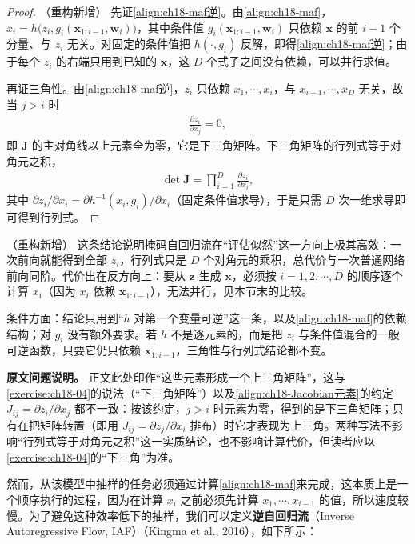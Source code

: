 \documentclass[../../main.tex]{subfiles}
\begin{document}
\begin{proof}（重构新增）
先证\eqref{align:ch18-maf逆}。由\eqref{align:ch18-maf}，$x_i=h\big(z_i,g_i(\bm{x}_{1:i-1},\bm{w}_i)\big)$，其中条件值 $g_i(\bm{x}_{1:i-1},\bm{w}_i)$ 只依赖 $\bm{x}$ 的前 $i-1$ 个分量、与 $z_i$ 无关。对固定的条件值把 $h(\cdot,g_i)$ 反解，即得\eqref{align:ch18-maf逆}；由于每个 $z_i$ 的右端只用到已知的 $\bm{x}$，这 $D$ 个式子之间没有依赖，可以并行求值。

再证三角性。由\eqref{align:ch18-maf逆}，$z_i$ 只依赖 $x_1,\cdots,x_i$，与 $x_{i+1},\cdots,x_D$ 无关，故当 $j>i$ 时
\begin{align*}
  \frac{\partial z_i}{\partial x_j}=0,
\end{align*}
即 $\bm{J}$ 的主对角线以上元素全为零，它是下三角矩阵。下三角矩阵的行列式等于对角元之积，
\begin{align*}
  \det\bm{J}=\prod_{i=1}^{D}\frac{\partial z_i}{\partial x_i},
\end{align*}
其中 $\partial z_i/\partial x_i=\partial h^{-1}(x_i,g_i)/\partial x_i$（固定条件值求导），于是只需 $D$ 次一维求导即可得到行列式。
\end{proof}

\begin{remark}（重构新增）
这条结论说明掩码自回归流在“评估似然”这一方向上极其高效：一次前向就能得到全部 $z_i$，行列式只是 $D$ 个对角元的乘积，总代价与一次普通网络前向同阶。代价出在反方向上：要从 $\bm{z}$ 生成 $\bm{x}$，必须按 $i=1,2,\cdots,D$ 的顺序逐个计算 $x_i$（因为 $x_i$ 依赖 $\bm{x}_{1:i-1}$），无法并行，见本节末的比较。

条件方面：结论只用到“$h$ 对第一个变量可逆”这一条，以及\eqref{align:ch18-maf}的依赖结构；对 $g_i$ 没有额外要求。若 $h$ 不是逐元素的，而是把 $z_i$ 与条件值混合的一般可逆函数，只要它仍只依赖 $\bm{x}_{1:i-1}$，三角性与行列式结论都不变。

\textbf{原文问题说明。} 正文此处印作“这些元素形成一个上三角矩阵”，这与\cref{exercise:ch18-04}的说法（“下三角矩阵”）以及\eqref{align:ch18-Jacobian元素}的约定 $J_{ij}=\partial z_i/\partial x_j$ 都不一致：按该约定，$j>i$ 时元素为零，得到的是下三角矩阵；只有在把矩阵转置（即用 $J_{ij}=\partial z_j/\partial x_i$ 排布）时它才表现为上三角。两种写法不影响“行列式等于对角元之积”这一实质结论，也不影响计算代价，但读者应以\cref{exercise:ch18-04}的“下三角”为准。
\end{remark}

然而，从该模型中抽样的任务必须通过计算\eqref{align:ch18-maf}来完成，这本质上是一个顺序执行的过程，因为在计算 $x_i$ 之前必须先计算 $x_1,\cdots,x_{i-1}$ 的值，所以速度较慢。为了避免这种效率低下的抽样，我们可以定义\textbf{逆自回归流}（Inverse Autoregressive Flow, IAF）（Kingma et al., 2016），如下所示：
\end{document}
